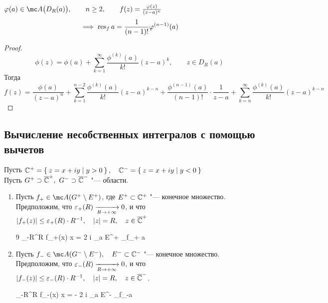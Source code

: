\begin{statement}\label{stmt:2}
	$ \phi(a) \in \mc A \big( D_R(a) \big), \qquad n \ge 2, \qquad f(z) = \frac{\phi(z)}{(z - a)^n} $
	$$ \implies \operatorname{res}_f a = \frac1{(n - 1)!}\varphi^{(n - 1)}(a) $$
\end{statement}

\begin{proof}
	$$ \phi(z) = \phi(a) + \sum_{k = 1}^\infty \frac{\phi^{(k)}(a)}{k!}(z - a)^k, \qquad z \in D_R(a) $$
	Тогда
	$$ f(z) = \frac{\phi(a)}{(z - a)^n} + \sum_{k = 1}^{n - 2} \frac{\phi^{(k)}(a)}{k!}(z - a)^{k - n} + \frac{\phi^{(n - 1)}(a)}{(n - 1)!} \cdot \frac1{z - a} + \sum_{k = n}^\infty \frac{\phi^{(k)}(a)}{k!}(z - a)^{k - n} $$
\end{proof}

\subsection{Вычисление несобственных интегралов с помощью вычетов}

\begin{theorem}
	Пусть $ \mathbb{C}^+ = \Set{z = x + iy \mid y > 0 }, \quad \mathbb{C}^- = \Set{z = x + iy \mid y < 0 } $ \\
	Пусть $ G^+ \supset \overline {\mathbb{C}}^+, ~ G^- \supset \overline {\mathbb{C}}^- $ "--- области.
	\begin{enumerate}
		\item Пусть $ f_+ \in \mc A(G^+ \setminus E^+) $, где $ E^+ \subset \mathbb{C}^+ $ "--- конечное множество. Предположим, что $ \varepsilon_+(R) \xrightarrow[R \to +\infty]{} 0 $, и что $ |f_+(z)| \le \varepsilon_+(R) \cdot R^{-1}, \quad |z| = R, \quad z \in \overline {\mathbb{C}}^+ $
		\begin{equ}9
			\implies {} \int_{-R}^R f_+(x) \di x = 2 \pi i \sum_{a \in E^+} \res_{f_+} a
		\end{equ}

		\item Пусть $ f_- \in \mc A(G^- \setminus E^-), \quad E^- \sub \Co^- $ "--- конечное множество. Предположим, что $ \varepsilon_-(R) \xrightarrow[R \to +\infty]{} 0 $, и что $ |f_-(z)| \le \varepsilon_-(R) \cdot R^{-1}, \quad |z| = R, \quad z \in \overline {\mathbb{C}}^- $.
		\begin{equ}{10}
			\implies {} \int_{-R}^R f_-(x) \di x = - 2 \pi i \sum_{a \in E^-} \res_{f_-}a
		\end{equ}
	\end{enumerate}
\end{theorem}

